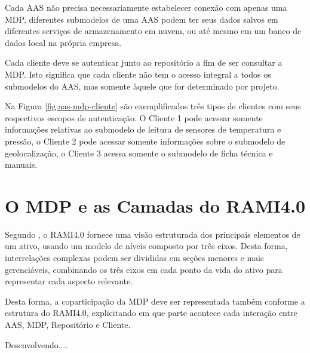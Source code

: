 	Cada AAS não precisa necessariamente estabelecer conexão com apenas uma MDP, diferentes submodelos de uma AAS podem ter seus dados salvos em diferentes serviços de armazenamento em nuvem, ou até mesmo em um banco de dados local na própria empresa.
	
	Cada cliente deve se autenticar junto ao repositório a fim de ser consultar a MDP. Isto significa que cada cliente não tem o acesso integral a todos os submodelos do AAS, mas somente àquele que for determinado por projeto.
	
	Na Figura \ref{fig:aas-mdp-cliente} são exemplificados três tipos de clientes com seus respectivos escopos de autenticação. O Cliente 1 pode acessar somente informações relativas ao submodelo de leitura de sensores de temperatura e pressão, o Cliente 2 pode acessar somente informações sobre o submodelo de geolocalização, o Cliente 3 acessa somente o submodelo de ficha técnica e manuais.
	
	
	
	\section{O MDP e as Camadas do RAMI4.0}

	Segundo , o RAMI4.0 fornece uma visão estruturada dos principais elementos de um ativo, usando um modelo de níveis composto por três eixos. Desta forma, interrelações complexas podem ser divididas em seções menores e mais gerenciáveis, combinando os três eixos em cada ponto da vida do ativo para representar cada aspecto relevante.
	
	Desta forma, a coparticipação da MDP deve ser representada também conforme a estrutura do RAMI4.0, explicitando em que parte acontece cada interação entre AAS, MDP, Repositório e Cliente.
	
	
	Desenvolvendo....